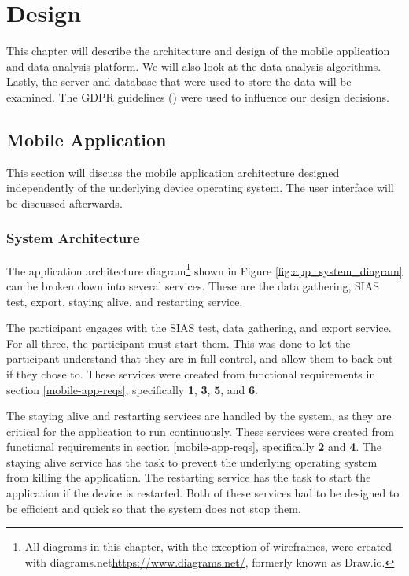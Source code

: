 \documentclass{l4proj}
\begin{document}
\chapter{Design}\label{design}
This chapter will describe the architecture and design of the mobile application and data analysis platform. We will also look at the data analysis algorithms. Lastly, the server and database that were used to store the data will be examined. The GDPR guidelines (\cite{gdpr_guidelines}) were used to influence our design decisions.

\section{Mobile Application}
This section will discuss the mobile application architecture designed independently of the underlying device operating system. The user interface will be discussed afterwards.

\subsection{System Architecture}
The application architecture diagram\footnote{All diagrams in this chapter, with the exception of wireframes, were created with diagrams.net\url{https://www.diagrams.net/}, formerly known as Draw.io.} shown in Figure \ref{fig:app_system_diagram} can be broken down into several services. These are the data gathering, SIAS test, export, staying alive, and restarting service.

The participant engages with the SIAS test, data gathering, and export service. For all three, the participant must start them. This was done to let the participant understand that they are in full control, and allow them to back out if they chose to. These services were created from functional requirements in section \ref{mobile-app-reqs}, specifically \textbf{1}, \textbf{3}, \textbf{5}, and \textbf{6}.

The staying alive and restarting services are handled by the system, as they are critical for the application to run continuously. These services were created from functional requirements in section \ref{mobile-app-reqs}, specifically \textbf{2} and \textbf{4}. The staying alive service has the task to prevent the underlying operating system from killing the application. The restarting service has the task to start the application if the device is restarted. Both of these services had to be designed to be efficient and quick so that the system does not stop them.
\end{document}
